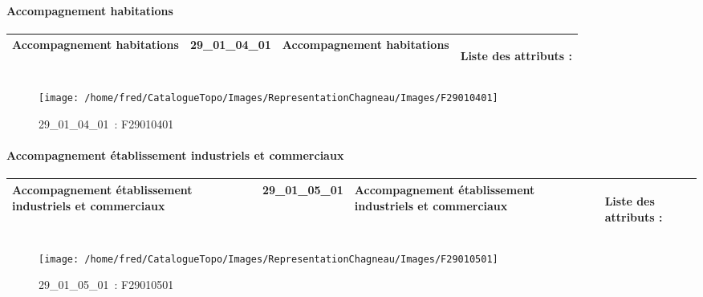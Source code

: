 \documentclass[12pt,titlepage,oneside]{book}
\begin{document}
\paragraph{Accompagnement habitations}
\noindent
\vspace{\baselineskip}

\renewcommand{\arraystretch}{1.2}
\begin{supertabular}{|p{10cm}|c|p{13cm}|p{12cm}|}
 Accompagnement habitations & 29\_01\_04\_01 & Accompagnement habitations & Liste des attributs :
\begin{enumerate}
\end{enumerate}
\\
\hline
\end{supertabular}
\begin{figure}[h!]
  \hfill         %
  \begin{minipage}[t]{3cm}
    \begin{center}
      \texttt{[image: /home/fred/CatalogueTopo/Images/RepresentationChagneau/Images/F29010401]}
      \caption[~29\_01\_04\_01]{\small{29\_01\_04\_01~:} \tiny{F29010401}}\label{F29010401}
    \end{center}
  \end{minipage}
\end{figure}


\paragraph{Accompagnement établissement industriels et commerciaux}
\noindent
\vspace{\baselineskip}

\renewcommand{\arraystretch}{1.2}
\begin{supertabular}{|p{10cm}|c|p{13cm}|p{12cm}|}
 Accompagnement établissement industriels et commerciaux & 29\_01\_05\_01 & Accompagnement établissement industriels et commerciaux & Liste des attributs :
\begin{enumerate}
\end{enumerate}
\\
\hline
\end{supertabular}
\begin{figure}[h!]
  \hfill         %
  \begin{minipage}[t]{3cm}
    \begin{center}
      \texttt{[image: /home/fred/CatalogueTopo/Images/RepresentationChagneau/Images/F29010501]}
      \caption[~29\_01\_05\_01]{\small{29\_01\_05\_01~:} \tiny{F29010501}}\label{F29010501}
    \end{center}
  \end{minipage}
\end{figure}
\end{document}
